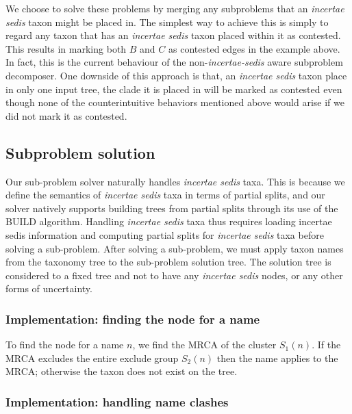 \documentclass[english]{article}
\begin{document}
We choose to solve these problems by merging any subproblems that an
\emph{incertae sedis} taxon might be placed in.
The simplest way to
achieve this is simply to regard any taxon that has an \emph{incertae
sedis }taxon placed within it as contested.
This results in marking
both $B$ and $C$ as contested edges in the example above.
In fact,
this is the current behaviour of the non-\emph{incertae-sedis} aware
subproblem decomposer.
One downside of this approach is that, an \emph{incertae sedis} taxon
    place in only one input tree, the clade it is placed in will be
    marked as contested even though none of the counterintuitive
    behaviors mentioned above would arise if we did not
    mark it as contested.



\subsection{Subproblem solution}

Our sub-problem solver naturally handles \emph{incertae sedis} taxa.
This is because we define the semantics of \emph{incertae sedis} taxa
in terms of partial splits, and our solver natively supports building
trees from partial splits through its use of the BUILD algorithm.
Handling \emph{incertae sedis} taxa thus requires loading incertae
sedis information and computing partial splits for \emph{incertae
sedis} taxa before solving a sub-problem.
After solving a sub-problem,
we must apply taxon names from the taxonomy tree to the sub-problem
solution tree.
The solution tree is considered to a fixed tree and not
to have any \emph{incertae sedis} nodes, or any other forms of
uncertainty.


\subsubsection{Implementation: finding the node for a name}

To find the node for a name $n$, we find the MRCA of the cluster
$S_{1}(n)$.
If the MRCA excludes the entire exclude group $S_{2}(n)$
then the name applies to the MRCA; otherwise the taxon does not exist
on the tree.

\subsubsection{Implementation: handling name clashes}
\end{document}
